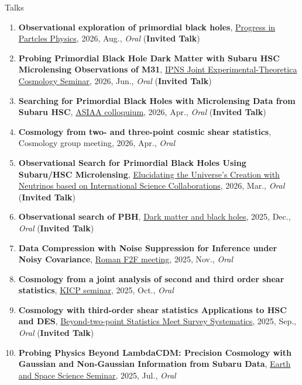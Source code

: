 \begin{rSection}{Talks}
\begin{enumerate}[itemsep=0pt, parsep=0pt, topsep=0pt, partopsep=0pt]
\item \textbf{Observational exploration of primordial black holes}, \href{https://indico.yukawa.kyoto-u.ac.jp/event/95/overview}{Progress in Partcles Physics}, 2026, Aug., \textit{Oral} (\textbf{Invited Talk})
\item \textbf{Probing Primordial Black Hole Dark Matter with Subaru HSC Microlensing Observations of M31}, \href{https://cosmophysics.gitlab.io/jointseminar.gitlab.io/sugiyama20260615.html}{IPNS Joint Experimental-Theoretica Cosmology Seminar}, 2026, Jun., \textit{Oral} (\textbf{Invited Talk})
\item \textbf{Searching for Primordial Black Holes with Microlensing Data from Subaru HSC}, \href{https://www.asiaa.sinica.edu.tw/activity/colloquium.php}{ASIAA colloquium}, 2026, Apr., \textit{Oral} (\textbf{Invited Talk})
\item \textbf{Cosmology from two- and three-point cosmic shear statistics}, Cosmology group meeting, 2026, Apr., \textit{Oral}
\item \textbf{Observational Search for Primordial Black Holes Using Subaru/HSC Microlensing}, \href{https://www-kam2.icrr.u-tokyo.ac.jp/event/19/}{Elucidating the Universe's Creation with Neutrinos based on International Science Collaborations}, 2026, Mar., \textit{Oral} (\textbf{Invited Talk})
\item \textbf{Observational search of PBH}, \href{https://indico.ipmu.jp/event/464/timetable/#20251205}{Dark matter and black holes}, 2025, Dec., \textit{Oral} (\textbf{Invited Talk})
\item \textbf{Data Compression with Noise Suppression 
for Inference under Noisy Covariance}, \href{https://roman-hlis-cosmology.caltech.edu/news/2024-f2f}{Roman F2F meeting}, 2025, Nov., \textit{Oral}
\item \textbf{Cosmology from a joint analysis of second and third order shear statistics}, \href{https://astrophysics.uchicago.edu/events/event/2530/?past=y}{KICP seminar}, 2025, Oct., \textit{Oral}
\item \textbf{Cosmology with third-order shear statistics Applications to HSC and DES}, \href{https://indico.ipmu.jp/event/460/overview}{Beyond-two-point Statistics Meet Survey Systematics}, 2025, Sep., \textit{Oral} (\textbf{Invited Talk})
\item \textbf{Probing Physics Beyond LambdaCDM: Precision Cosmology with Gaussian and Non-Gaussian Information from Subaru Data}, \href{https://www.ess.sci.osaka-u.ac.jp/researchers/seminar.html}{Earth and Space Science Seminar}, 2025, Jul., \textit{Oral}

\end{enumerate}
\end{rSection}
